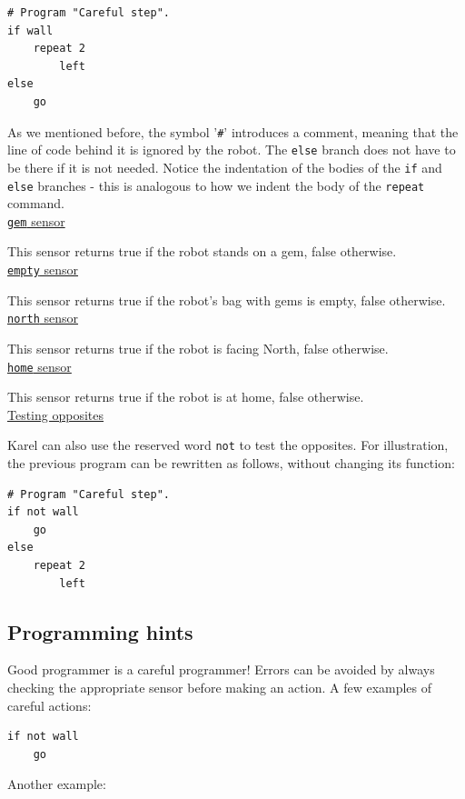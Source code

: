 {{{{\begin{verbatim}
# Program "Careful step".
if wall
    repeat 2
        left
else
    go
\end{verbatim}
As we mentioned before, the symbol '{\tt \#}' introduces a comment, meaning that the line 
of code behind it is ignored by the robot.
The {\tt else} branch does not have to be there if it is not needed. Notice the indentation 
of the bodies of the {\tt if} and {\tt else} branches - this is analogous 
to how we indent the body of the {\tt repeat} command.\\

\noindent
\underline{{\tt gem} sensor}

This sensor returns true if the robot stands on a gem, false otherwise. \\

\noindent
\underline{{\tt empty} sensor}

This sensor returns true if the robot's bag with gems is empty, false otherwise. \\

\noindent
\underline{{\tt north} sensor}

This sensor returns true if the robot is facing North, false otherwise.\\

\noindent
\underline{{\tt home} sensor}

This sensor returns true if the robot is at home, false otherwise.\\

\noindent
\underline{Testing opposites}

Karel can also use the reserved word {\tt not} to test the opposites.
For illustration, the previous program can be rewritten as follows, without 
changing its function:
\begin{verbatim}
# Program "Careful step".
if not wall
    go
else
    repeat 2
        left
\end{verbatim}

\subsection{Programming hints}

Good programmer is a careful programmer! Errors can be avoided by always checking the 
appropriate sensor before making an action. A few examples of careful actions:
 
\begin{verbatim}
if not wall
    go
\end{verbatim}
Another example:
 
}}}}
